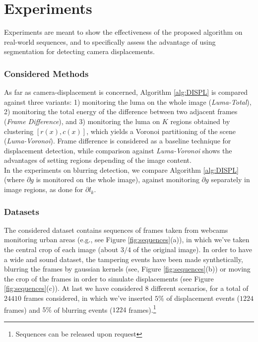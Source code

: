 \documentclass{llncs}
\newcommand{\gi}[1]{{\textcolor{red}{[\small \textbf{Giacomo}: #1]}}}
\begin{document}
\vspace{-0.2cm}
\section{Experiments}\label{sec:experiments}
Experiments are meant to show the effectiveness of the proposed algorithm on real-world sequences, and to specifically assess the advantage of using segmentation for detecting camera displacements. 
\vspace{-0.3cm}
\subsubsection{Considered Methods}
As far as camera-displacement is concerned, Algorithm \eqref{alg:DISPL} is compared against three variants: 1) monitoring the luma on the whole image (\emph{Luma-Total}), 2) monitoring the total energy of the difference between two adjacent frames (\emph{Frame Difference}), and 3) monitoring the luma on $K$ regions obtained by clustering $[r(x), c(x)]$, which yields a Voronoi partitioning of the scene (\emph{Luma-Voronoi}). Frame difference is considered as a baseline technique for displacement detection, while comparison against \emph{Luma-Voronoi} shows the advantages of setting regions depending of the image content. \\
In the experiments on blurring detection, we compare Algorithm \ref{alg:DISPL} (where $\partial g$ is monitored on the whole image), against monitoring $\partial g$ separately in image regions, as done for $\partial l_k$.
\vspace{-0.3cm}
\subsubsection{Datasets}
The considered dataset contains  sequences of  frames taken from webcams monitoring urban areas (e.g., see Figure \ref{fig:sequences}(a)), in which we've taken the central crop of each image (about $3/4$ of the original image). 
In order to have a wide and sound dataset, the tampering events have been made synthetically, blurring the frames by gaussian kernels (see, Figure \ref{fig:sequences}(b)) or moving the crop of the frames in order to simulate displacements (see Figure \ref{fig:sequences}(c)). 
At last we have considered $8$ different scenarios, for a total of $24410$ frames considered, in which we've inserted $5\%$ of displacement events ($1224$ frames) and $5\%$ of blurring events ($1224$ frames).\footnote{Sequences can be released upon request}
\vspace{-0.3cm}
\end{document}
